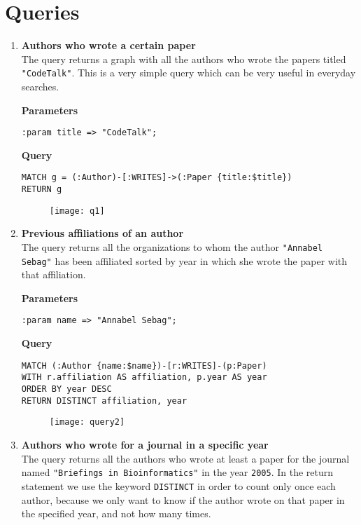 \section{Queries}
\label{sec:queries}%
\begin{enumerate}
    \item \textbf{Authors who wrote a certain paper}\\
    The query returns a graph with all the authors who wrote the papers titled \verb|"CodeTalk"|.
    This is a very simple query which can be very useful in everyday searches.

    \textbf{Parameters}
    \begin{lstlisting}[label={lst:lstlisting20}]
:param title => "CodeTalk";
    \end{lstlisting}
    \textbf{Query}
    \begin{lstlisting}[label={lst:lstlisting21}]
MATCH g = (:Author)-[:WRITES]->(:Paper {title:$title})
RETURN g
    \end{lstlisting}
    \begin{figure}[H]
        \begin{center}
            \texttt{[image: q1]}
            \label{fig:q1}%
        \end{center}
    \end{figure}
    \item \textbf{Previous affiliations of an author}\\
    The query returns all the organizations to whom the author \verb|"Annabel Sebag"| has been affiliated sorted by year in which she wrote the paper with that affiliation.

    \textbf{Parameters}
    \begin{lstlisting}[label={lst:lstlisting22}]
:param name => "Annabel Sebag";
    \end{lstlisting}
    \textbf{Query}
    \begin{lstlisting}[label={lst:lstlisting23}]
MATCH (:Author {name:$name})-[r:WRITES]-(p:Paper)
WITH r.affiliation AS affiliation, p.year AS year
ORDER BY year DESC
RETURN DISTINCT affiliation, year
    \end{lstlisting}
    \begin{figure}[H]
        \begin{center}
            \texttt{[image: query2]}
            \label{fig:query2}%
        \end{center}
    \end{figure}
    \item \textbf{Authors who wrote for a journal in a specific year}\\
    The query returns all the authors who wrote at least a paper for the journal named \verb|"Briefings in Bioinformatics"| in the year \verb|2005|.
    In the return statement we use the keyword \verb|DISTINCT| in order to count only once each author, because we only want to know if the author wrote on that paper in the specified year, and not how many times.


\end{enumerate}
